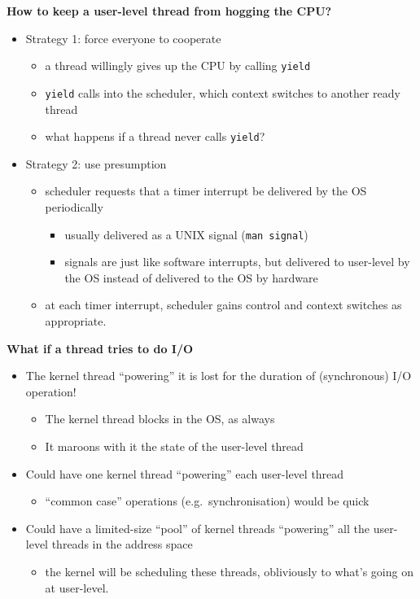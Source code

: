 \documentclass[11pt,a4paper]{article}
\begin{document}
\textbf{How to keep a user-level thread from hogging the CPU?}
\begin{itemize}
    \item Strategy 1: force everyone to cooperate
        \begin{itemize}
            \item a thread willingly gives up the CPU by calling \texttt{yield}
            \item \texttt{yield} calls into the scheduler, which context switches to
                another ready thread
            \item what happens if a thread never calls \texttt{yield}?
        \end{itemize}
    \item Strategy 2: use presumption
        \begin{itemize}
            \item scheduler requests that a timer interrupt be delivered by the OS
                periodically
                \begin{itemize}
                    \item usually delivered as a UNIX signal (\texttt{man signal})
                    \item signals are just like software interrupts, but delivered to
                        user-level by the OS instead of delivered to the OS by hardware
                \end{itemize}
            \item at each timer interrupt, scheduler gains control and context switches
                as appropriate.
        \end{itemize}
\end{itemize}

\textbf{What if a thread tries to do I/O}
\begin{itemize}
    \item The kernel thread ``powering'' it is lost for the duration of (synchronous)
        I/O operation!
        \begin{itemize}
            \item The kernel thread blocks in the OS, as always
            \item It maroons with it the state of the user-level thread
        \end{itemize}
    \item Could have one kernel thread ``powering'' each user-level thread
        \begin{itemize}
            \item ``common case'' operations (e.g.\ synchronisation) would be quick
        \end{itemize}
    \item Could have a limited-size ``pool'' of kernel threads ``powering'' all the
        user-level threads in the address space
        \begin{itemize}
            \item the kernel will be scheduling these threads, obliviously to what's going
                on at user-level.
        \end{itemize}
\end{itemize}
\end{document}
